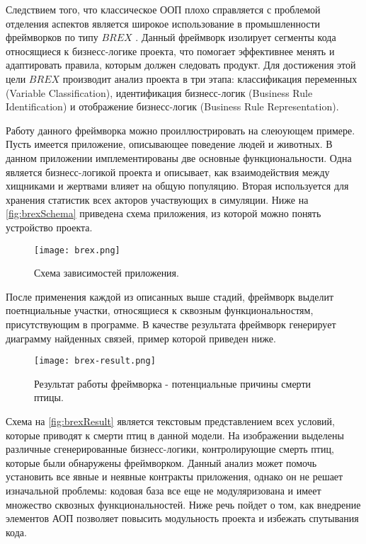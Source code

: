 Следствием того, что классическое ООП плохо справляется с проблемой отделения аспектов является широкое использование в промышленности фреймворков по типу $BREX$ \cite{brex}. Данный фреймворк изолирует сегменты кода относящиеся к бизнесс-логике проекта, что помогает эффективнее менять и адаптировать правила, которым должен следовать продукт. Для достижения этой цели $BREX$ производит анализ проекта в три этапа: классификация переменных (Variable Classification), идентификация бизнесс-логик (Business Rule Identification) и отображение бизнесс-логик (Business Rule Representation).

Работу данного фреймворка можно проиллюстрировать на слеюующем примере. Пусть имеется приложение, описывающее поведение людей и животных. В данном приложении имплементированы две основные функциональности. Одна является бизнесс-логикой проекта и описывает, как взаимодействия между хищниками и жертвами влияет на общую популяцию. Вторая используется для хранения статистик всех акторов участвующих в симуляции. Ниже на \autoref{fig:brexSchema} приведена схема приложения, из которой можно понять устройство проекта.

\begin{figure}[h]
\centering
\texttt{[image: brex.png]}
\caption{Схема зависимостей приложения.}
\label{fig:brexSchema}
\end{figure}

После применения каждой из описанных выше стадий, фреймворк выделит поетнциальные участки, относящиеся к сквозным функциональностям, присутствующим в программе. В качестве результата фреймворк генерирует диаграмму найденных связей, пример которой приведен ниже.

\begin{figure}[h]
\centering
\texttt{[image: brex-result.png]}
\caption{Результат работы фреймворка - потенциальные причины смерти птицы.}
\label{fig:brexResult}
\end{figure}

Схема на \autoref{fig:brexResult} является текстовым представлением всех условий, которые приводят к смерти птиц в данной модели. На изображении выделены различные сгенерированные бизнесс-логики, контролирующие смерть птиц, которые были обнаружены фреймворком. Данный анализ может помочь установить все явные и неявные контракты приложения, однако он не решает изначальной проблемы: кодовая база все еще не модуляризована и имеет множество сквозных функциональностей. Ниже речь пойдет о том, как внедрение элементов АОП позволяет повысить модульность проекта и избежать спутывания кода.


